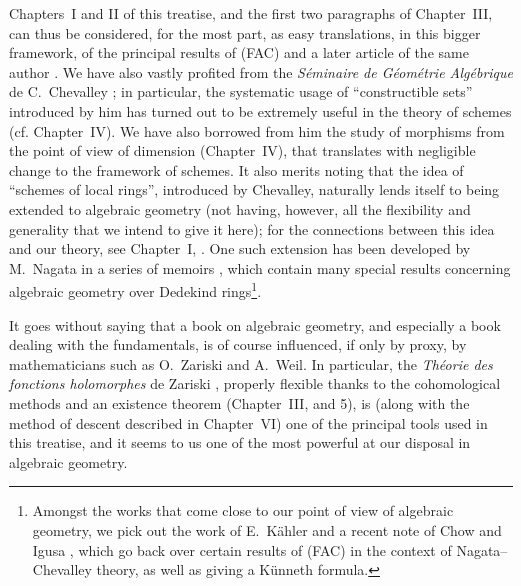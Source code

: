 Chapters~I and II of this treatise, and the first two paragraphs of Chapter~III,
can thus be considered, for the most part, as easy translations, in this bigger
framework, of the principal results of (FAC) and a later article of the same
author \cite{I-15}. We have also vastly profited from the \emph{S\'eminaire de
G\'eom\'etrie Alg\'ebrique} de C.~Chevalley \cite{I-1}; in particular, the
systematic usage of ``constructible sets'' introduced by him has turned out to
be extremely useful in the theory of schemes (cf. Chapter~IV). We have also
borrowed from him the study of morphisms from
the point of view of dimension (Chapter~IV), that translates with negligible
change to the framework of schemes. It also merits noting that the idea of
``schemes of local rings'', introduced by Chevalley, naturally lends itself to
being extended to algebraic geometry (not having, however, all the flexibility
and generality that we intend to give it here); for the connections between this
idea and our theory, see Chapter~I, . One such extension has been
developed by M.~Nagata in a series of memoirs \cite{I-9}, which contain many
special results concerning algebraic geometry over Dedekind
rings\footnote{Amongst the works that come close to our point of view of
algebraic geometry, we pick out the work of E.~K\"ahler \cite{I-22} and a recent
note of Chow and Igusa \cite{I-3}, which go back over certain results of (FAC) in
the context of Nagata--Chevalley theory, as well as giving a K\"unneth
formula.}.

\sectionbreak

It goes without saying that a book on algebraic geometry, and especially a book
dealing with the fundamentals, is of course influenced, if only by proxy, by
mathematicians such as O.~Zariski and A.~Weil. In particular, the
\emph{Th\'eorie des fonctions holomorphes} de Zariski \cite{I-20}, properly
flexible thanks to the cohomological methods and an existence theorem
(Chapter~III, \textsection{} and 5), is (along with the method of
descent described in Chapter~VI) one of the principal tools used in this
treatise, and it seems to us one of the most powerful at our disposal in
algebraic geometry.

